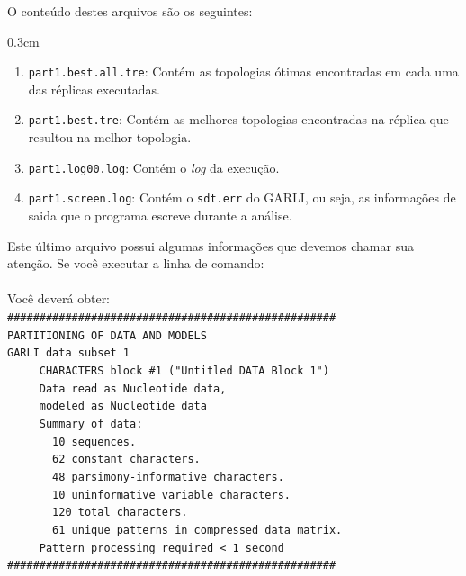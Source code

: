 \begin{refsection}
O conteúdo destes arquivos são os seguintes:


\begin {myindentpar}{0.3cm}
\begin{enumerate}[\itshape 1.]

	\item{\texttt{part1.best.all.tre}:} Contém as topologias ótimas encontradas em cada uma das réplicas executadas.

	\item{\texttt{part1.best.tre}:} Contém as melhores topologias encontradas na réplica que resultou na melhor topologia.

	\item{\texttt{part1.log00.log}:} Contém o \textit{log} da execução.

	\item{\texttt{part1.screen.log}:} Contém o \texttt{sdt.err} do GARLI, ou seja, as informações de saida que o programa escreve durante a análise.

\end{enumerate}
\end{myindentpar}

Este último arquivo possui algumas informações que devemos chamar sua atenção. Se você executar a linha de comando:\\

\\

Você deverá obter:\\

\scriptsize
\noindent\texttt{\#\#\#\#\#\#\#\#\#\#\#\#\#\#\#\#\#\#\#\#\#\#\#\#\#\#\#\#\#\#\#\#\#\#\#\#\#\#\#\#\#\#\#\#\#\#\#\#\#\#\#}\\
\texttt{PARTITIONING~OF~DATA~AND~MODELS}\\
\texttt{GARLI~data~subset~1}\\
\texttt{~~~~~CHARACTERS~block~\#1~("Untitled~DATA~Block~1")}\\
\texttt{~~~~~Data~read~as~Nucleotide~data,}\\
\texttt{~~~~~modeled~as~Nucleotide~data}\\
\texttt{~~~~~Summary~of~data:}\\
\indent\texttt{~~~~~~~10~sequences.}\\
\indent\texttt{~~~~~~~62~constant~characters.}\\
\indent\texttt{~~~~~~~48~parsimony-informative~characters.}\\
\indent\texttt{~~~~~~~10~uninformative~variable~characters.}\\
\indent\texttt{~~~~~~~120~total~characters.}\\
\indent\texttt{~~~~~~~61~unique~patterns~in~compressed~data~matrix.}\\
\texttt{~~~~~Pattern~processing~required~<~1~second}\\
\texttt{\#\#\#\#\#\#\#\#\#\#\#\#\#\#\#\#\#\#\#\#\#\#\#\#\#\#\#\#\#\#\#\#\#\#\#\#\#\#\#\#\#\#\#\#\#\#\#\#\#\#\#}\\


\end{refsection}
